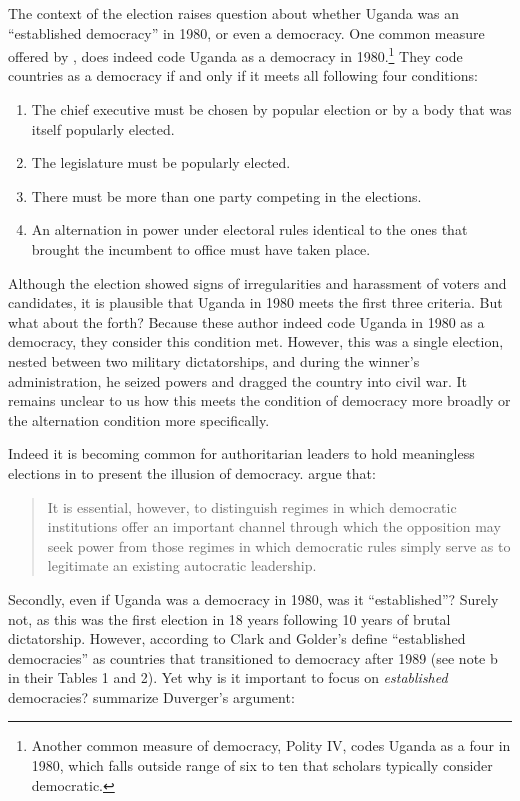 \documentclass[12pt]{article}
\begin{document}
The context of the election raises question about whether Uganda was an ``established democracy'' in 1980, or even a democracy. 
One common measure offered by \cite{CheibubGandhiVreeland2010}, does indeed code Uganda as a democracy in 1980.\footnote{Another common measure of democracy, Polity IV, codes Uganda as a four in 1980, which falls outside range of six to ten that scholars typically consider democratic.} 
They code countries as a democracy if and only if it meets all following four conditions:
\begin{enumerate}
\item The chief executive must be chosen by popular election or by a body that was itself popularly elected.
\item The legislature must be popularly elected.
\item There must be more than one party competing in the elections.
\item An alternation in power under electoral rules identical to the ones that brought the incumbent to office must have taken place.
\end{enumerate}

Although the election showed signs of irregularities and harassment of voters and candidates, it is plausible that Uganda in 1980 meets the first three criteria. 
But what about the forth? 
Because these author indeed code Uganda in 1980 as a democracy, they consider this condition met. 
However, this was a single election, nested between two military dictatorships, and during the winner's administration, he seized powers and dragged the country into civil war. 
It remains unclear to us how this meets the condition of democracy more broadly or the alternation condition more specifically.

Indeed it is becoming common for authoritarian leaders to hold meaningless elections in to present the illusion of democracy. \cite{LevitskyWay2002} argue that:
\begin{quote}
It is essential, however, to distinguish regimes in which democratic institutions offer an important channel through which the opposition may seek power from those regimes in which democratic rules simply serve as to legitimate an existing autocratic leadership.
\end{quote}

Secondly, even if Uganda was a democracy in 1980, was it ``established''? 
Surely not, as this was the first election in 18 years following 10 years of brutal dictatorship. 
However, according to Clark and Golder's define ``established democracies'' as countries that transitioned to democracy after 1989 (see note b in their Tables 1 and 2). 
Yet why is it important to focus on \textit{established} democracies? \citet[p. 706]{ClarkGolder2006} summarize Duverger's argument: 
\end{document}
